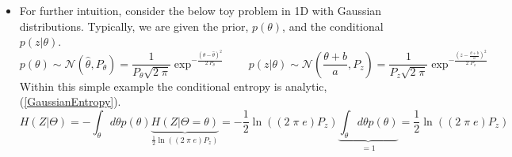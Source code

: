 \documentclass[10pt]{amsart}
\newcommand{\eqn}[1]{(\ref{#1})}
\begin{document}
\begin{enumerate}
\begin{itemize}
\item For further intuition, consider the below toy problem in 1D with
Gaussian distributions. 
Typically, we are given the prior, $p(\theta)$, and the conditional
$p(z|\theta)$.
  \[
   p(\theta) \sim \mathcal{N}\left(\hat{\theta},P_\theta\right)  
      = \frac{1}{P_\theta \sqrt{2\; \pi}} 
 \exp^{-\frac{(\theta -\hat{\theta})^2}{2 \; P_\theta}}
   \qquad
   p(z|\theta) \sim \mathcal{N}\left( \frac{\theta +b}{a},P_z \right)  
      = \frac{1}{P_z \sqrt{2\; \pi}} 
 \exp^{-\frac{(z -\frac{\theta+b}{a})^2}{2 \; P_z}}
  \]
Within this simple example the conditional entropy is analytic,
\eqn{GaussianEntropy}.
\[
H(Z|\Theta) 
     = 
     - 
       \int_\theta  d \theta
       p(\theta) 
       \underbrace{ 
       H(Z|\Theta = \theta) }_{
          \frac{1}{2} \ln \left((2 \; \pi \; e)  P_z \right) 
         }
     = 
     - \frac{1}{2} \ln \left((2 \; \pi \; e)  P_z \right) 
       \underbrace{ 
       \int_\theta  d \theta
       p(\theta) 
        }_{ = 1}
     = 
          \frac{1}{2} \ln \left((2 \; \pi \; e)  P_z \right) 
\]


\end{itemize}
\end{enumerate}
\end{document}
